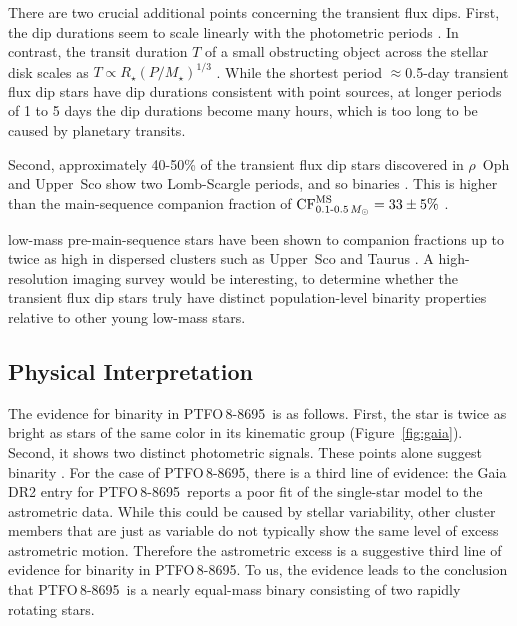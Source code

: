 \documentclass[12pt,twocolumn,tighten]{aastex62}
\newcommand{\ptfo}{PTFO$\,$8-8695}
\begin{document}
There are two crucial additional points concerning the transient flux
dips.  First, the dip durations seem to scale linearly with the
photometric periods \citep[][Figure~26]{stauffer_orbiting_2017}.  In
contrast, the transit duration $T$ of a small obstructing object
across the stellar disk scales as $T \propto R_\star
(P/M_\star)^{1/3}$ \citep{winn_exoplanet_2010}.  While the shortest
period $\approx$0.5-day transient flux dip stars have dip durations
consistent with point sources, at longer periods of 1 to 5 days the
dip durations become many hours, which is too long to be caused by
planetary transits.

Second, approximately 40-50\% of the transient flux dip stars
discovered in $\rho$~Oph and Upper~Sco show two Lomb-Scargle periods,
and so  binaries
\citep[][Table~1]{stauffer_orbiting_2017}.  This is higher than the
main-sequence companion fraction of ${\rm
CF}_{0.1\text{-}0.5\,M_\odot}^{\rm MS} = 33 \pm 5\%$
\citep{henry_solar_2006,duchene_stellar_2013,winters_solar_2019}.

 low-mass pre-main-sequence stars 
have been shown to  companion fractions up to twice as
high in dispersed clusters such as Upper~Sco and Taurus
\citep{kraus_mapping_2008,kraus_mapping_2011}.  A high-resolution
imaging survey would be interesting, to determine whether the
transient flux dip stars truly have distinct population-level binarity
properties relative to other young low-mass stars.


\subsection{Physical Interpretation}
\label{subsec:physical}

The evidence for binarity in \ptfo\ is as follows.  First, the star is
twice as bright as stars of the same color in its kinematic group
(Figure~\ref{fig:gaia}).  Second, it shows two distinct photometric
signals.  These points alone suggest binarity
\citep{stauffer_rotevol_2018}.  For the case of \ptfo, there is a
third line of evidence: the Gaia DR2 entry for \ptfo\ reports a poor
fit of the single-star model to the astrometric data.  While this
could be caused by stellar variability, other cluster members that are
just as variable do not typically show the same level of excess
astrometric motion.  Therefore the astrometric excess is a suggestive
third line of evidence for binarity in \ptfo. To us, the evidence
leads to the conclusion that \ptfo\ is a nearly equal-mass binary
consisting of two rapidly rotating stars.
\end{document}
